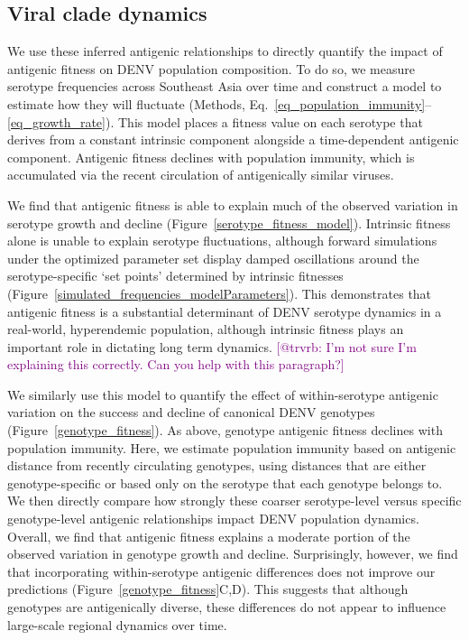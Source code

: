 \documentclass[11pt,oneside,letterpaper]{article}
\def\sbc#1{\textcolor{purple}{[#1]}}
\begin{document}
\subsection*{Viral clade dynamics}
We use these inferred antigenic relationships to directly quantify the impact of antigenic fitness on DENV population composition.
To do so, we measure serotype frequencies across Southeast Asia over time and construct a model to estimate how they will fluctuate (Methods, Eq.~\ref{eq_population_immunity}--\ref{eq_growth_rate}).
This model places a fitness value on each serotype that derives from a constant intrinsic component alongside a time-dependent antigenic component.
Antigenic fitness declines with population immunity, which is accumulated via the recent circulation of antigenically similar viruses.

We find that antigenic fitness is able to explain much of the observed variation in serotype growth and decline (Figure~\ref{serotype_fitness_model}).
Intrinsic fitness alone is unable to explain serotype fluctuations, although forward simulations under the optimized parameter set display damped oscillations around the serotype-specific `set points' determined by intrinsic fitnesses (Figure~\ref{simulated_frequencies_modelParameters}).
This demonstrates that antigenic fitness is a substantial determinant of DENV serotype dynamics in a real-world, hyperendemic population, although intrinsic fitness plays an important role in dictating long term dynamics.
\sbc{@trvrb: I'm not sure I'm explaining this correctly. Can you help with this paragraph?}

We similarly use this model to quantify the effect of within-serotype antigenic variation on the success and decline of canonical DENV genotypes (Figure~\ref{genotype_fitness}).
As above, genotype antigenic fitness declines with population immunity.
Here, we estimate population immunity based on antigenic distance from recently circulating genotypes, using distances that are either genotype-specific or based only on the serotype that each genotype belongs to.
We then directly compare how strongly these coarser serotype-level versus specific genotype-level antigenic relationships impact DENV population dynamics.
Overall, we find that antigenic fitness explains a moderate portion of the observed variation in genotype growth and decline.
Surprisingly, however, we find that incorporating within-serotype antigenic differences does not improve our predictions (Figure~\ref{genotype_fitness}C,D).
This suggests that although genotypes are antigenically diverse, these differences do not appear to influence large-scale regional dynamics over time.
\end{document}
